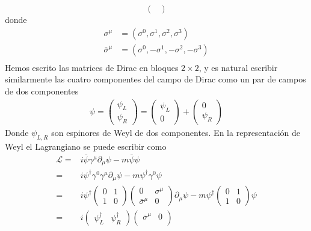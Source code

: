 \begin{subappendices}
\begin{equation}
\begin{pmatrix}
  \end{pmatrix}
\end{equation}
donde
\begin{align}
  \sigma^\mu&=(\sigma^0,\sigma^1,\sigma^2,\sigma^3)\nonumber\\
  \bar{\sigma}^\mu&=(\sigma^0,-\sigma^1,-\sigma^2,-\sigma^3)\nonumber\\
\end{align}
Hemos escrito las matrices de Dirac en bloques $2\times2$, y es natural escribir similarmente las cuatro componentes del campo de Dirac como un par de campos de dos componentes
\begin{align}
  \psi=  \begin{pmatrix}
    \psi_L\\
    \psi_R    
  \end{pmatrix}=\begin{pmatrix}
    \psi_L\\
    0   
  \end{pmatrix}+\begin{pmatrix}
    0\\
    \psi_R    
  \end{pmatrix}
\end{align}
Donde $\psi_{L,R}$ son espinores de Weyl de dos componentes. En la representaci\'on de Weyl el Lagrangiano se puede escribir como
\begin{align}
\label{eq:200}
  \mathcal{L}=&i\bar{\psi}\gamma^\mu\partial_\mu\psi-m\bar{\psi}\psi\nonumber\\
  =&i\psi^\dagger \gamma^0\gamma^\mu\partial_\mu\psi-m\psi^\dagger \gamma^0 \psi\nonumber\\
  =&i\psi^\dagger  \begin{pmatrix}
    0 & 1\\
    1&0
  \end{pmatrix}
  \begin{pmatrix}
    0 &\sigma^\mu \\
    \bar{\sigma}^\mu&0
  \end{pmatrix}\partial_\mu\psi-m\psi^\dagger
  \begin{pmatrix}
    0 & 1\\
    1&0
  \end{pmatrix}\psi\nonumber\\
=&i\begin{pmatrix}
 \psi_L^\dagger & \psi_R^\dagger
\end{pmatrix}
 \begin{pmatrix}
   \bar{\sigma}^\mu &0\\

\end{pmatrix}
\end{align}
\end{subappendices}
